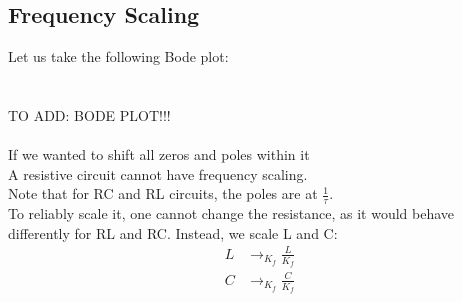 \documentclass[nobib]{tufte-handout}
\begin{document}
\subsection{Frequency Scaling}
Let us take the following Bode plot:\\ ~\\~\\TO ADD: BODE PLOT!!!\\~\\

If we wanted to shift all zeros and poles within it\\ A resistive circuit
cannot have frequency scaling.\\ Note that for RC and RL circuits, the poles
are at $\frac{1}{\tau}$. \\ To reliably scale it, one cannot change the
resistance, as it would behave differently for RL and RC. Instead, we scale L
and C:
\begin{align*}
    L & \rightarrow_{K_f} \frac{L}{K_f} \\
    C & \rightarrow_{K_f} \frac{C}{K_f}
\end{align*}
\end{document}
